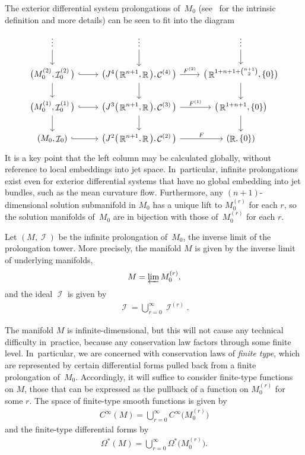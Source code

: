 \documentclass[10pt,a4paper]{amsart}
\DeclareMathOperator{\R}{\mathbb{R}}
\DeclareMathOperator{\I}{\mathcal{I}}
\DeclareMathOperator{\contact}{\mathcal{C}}
\newcommand{\cinfinity}[1]{C^\infty\big(#1\big)}
\newcommand{\M}[1]{M_0^{(#1)}}
\newcommand{\Ip}[1]{\I^{(#1)}}
\newcommand{\cMinfty}{C^\infty(M)}
\newcommand{\jet}[1]{J^{#1}\big(\R^{n+1},\R\big)}
\numberwithin{equation}{section}
\begin{document}
The exterior differential system prolongations of~$M_0$ (see~\cite{BCGGG, Characteristic_Cohomology_I} for the intrinsic definition and more details) can be seen to fit into the diagram
\[
{\begin{tikzcd}
\vdots \arrow{d} & \vdots \ar[d] & \vdots \arrow[d]
\\
\big(M_0^{(2)}, \I_0^{(2)}\big) \arrow{d}\arrow[hookrightarrow]{r} & \big(\jet{4}, \contact^{(4)}\big) \ar[d]\ar[r, "F^{(2)}"] & \big(\R^{1 + n+1 + \binom{n+1}{2}}, \{0\}\big) \arrow[d]
\\
\big(M_0^{(1)}, \I_0^{(1)}\big) \ar[d]\arrow[hookrightarrow]{r} & \big(\jet{3}, \contact^{(3)}\big) \ar[d]\ar[r, "F^{(1)}"] & \big(\R^{1 + n+1}, \{0\}\big) \arrow[d]
\\
(M_0, \I_0) \arrow[hookrightarrow]{r} & \big(\jet{2}, \contact^{(2)}\big) \ar[r, "F"] & (\R, \{0\})
\end{tikzcd}}
\]
It is a key point that the left column may be calculated globally, without reference to local embeddings into jet space. In~particular, infinite prolongations exist even for exterior differential systems that have no global embedding into jet bundles, such as the mean curvature flow.
Furthermore, any $(n+1)$-dimensional solution submanifold in $M_0$ has a unique lift to $\M{r}$ for each $r$, so the solution manifolds of~$M_0$ are in bijection with those of~$\M{r}$ for each $r$.

Let $(M,\I)$ be the infinite prolongation of~$M_0$, the inverse limit of the prolongation tower. More precisely, the manifold $M$ is given by the inverse limit of underlying manifolds,
\begin{gather*}
M = \varprojlim \M{r} ,
\end{gather*}
and the ideal $\I$ is given by
\begin{gather*}
\I = \bigcup_{r=0}^\infty \Ip{r} .
\end{gather*}

The manifold $M$ is infinite-dimensional, but this will not cause any technical difficulty in~prac\-tice, because any conservation law factors through some finite level. In~particular, we are concerned with conservation laws of \emph{finite type}, which are represented by certain differential forms pulled back from a finite prolongation of~$M_0$.
Accordingly, it will suffice to consider finite-type functions on $M$, those that can be expressed as the pullback of a function on $\M{r}$ for some $r$.
The space of finite-type smooth functions is given by
\begin{gather*}
\cMinfty = \bigcup_{r=0}^\infty \cinfinity{\M{r}}
\end{gather*}
and the finite-type differential forms by
\begin{gather*}
\Omega^*(M) = \bigcup_{r=0}^\infty \Omega^*\big(\M{r}\big) .
\end{gather*}
\end{document}
